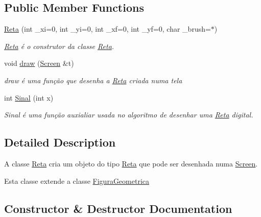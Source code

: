 \subsection*{Public Member Functions}
\begin{DoxyCompactItemize}
\item 
\hyperlink{class_reta_a3eea3336e04e4f8acdb9cbb3cafb472a}{Reta} (int \+\_\+xi=0, int \+\_\+yi=0, int \+\_\+xf=0, int \+\_\+yf=0, char \+\_\+brush=\textquotesingle{}$\ast$\textquotesingle{})
\begin{DoxyCompactList}\small\item\em \hyperlink{class_reta}{Reta} é o construtor da classe \hyperlink{class_reta}{Reta}. \end{DoxyCompactList}\item 
void \hyperlink{class_reta_ac2e9805183cd474b62bffd8b032cd780}{draw} (\hyperlink{class_screen}{Screen} \&t)
\begin{DoxyCompactList}\small\item\em draw é uma função que desenha a \hyperlink{class_reta}{Reta} criada numa tela \end{DoxyCompactList}\item 
int \hyperlink{class_reta_a0890517655f27827a827c88850f8984e}{Sinal} (int x)
\begin{DoxyCompactList}\small\item\em Sinal é uma função auxialiar usada no algoritmo de desenhar uma \hyperlink{class_reta}{Reta} digital. \end{DoxyCompactList}\end{DoxyCompactItemize}


\subsection{Detailed Description}
A classe \hyperlink{class_reta}{Reta} cria um objeto do tipo \hyperlink{class_reta}{Reta} que pode ser desenhada numa \hyperlink{class_screen}{Screen}. 

Esta classe extende a classe \hyperlink{class_figura_geometrica}{Figura\+Geometrica} 

\subsection{Constructor \& Destructor Documentation}
